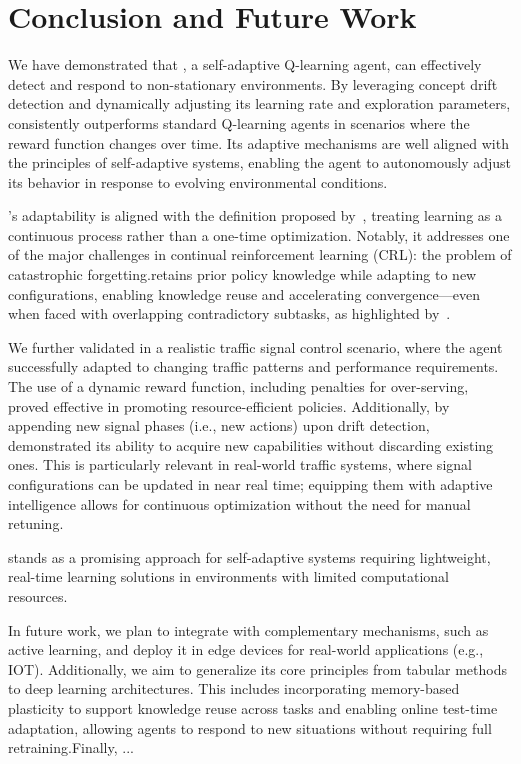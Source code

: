 
\section{Conclusion and Future Work}
\label{sec:conclusion}
We have demonstrated that \adaptiverl, a self-adaptive Q-learning agent, can effectively detect and respond to non-stationary environments. By leveraging concept drift detection and dynamically adjusting its learning rate and exploration parameters, \adaptiverl consistently outperforms standard Q-learning agents in scenarios where the reward function changes over time. Its adaptive mechanisms are well aligned with the principles of self-adaptive systems, enabling the agent to autonomously adjust its behavior in response to evolving environmental conditions.

\adaptiverl's adaptability is aligned with the definition proposed by~\citet{abel2023definitioncontinualreinforcementlearning}, treating learning as a continuous process rather than a one-time optimization. Notably, it addresses one of the major challenges in continual reinforcement learning (CRL): the problem of catastrophic forgetting.\adaptiverl retains prior policy knowledge while adapting to new configurations, enabling knowledge reuse and accelerating convergence—even when faced with overlapping contradictory subtasks, as highlighted by~\citet{Bagus2022}.

We further validated \adaptiverl in a realistic traffic signal control scenario, where the agent successfully adapted to changing traffic patterns and performance requirements. The use of a dynamic reward function, including penalties for over-serving, proved effective in promoting resource-efficient policies. Additionally, by appending new signal phases (i.e., new actions) upon drift detection, \adaptiverl demonstrated its ability to acquire new capabilities without discarding existing ones. This is particularly relevant in real-world traffic systems, where signal configurations can be updated in near real time; equipping them with adaptive intelligence allows for continuous optimization without the need for manual retuning.

\adaptiverl stands as a promising approach for self-adaptive systems requiring lightweight, real-time learning solutions in environments with limited computational resources.

In future work, we plan to integrate \adaptiverl with complementary mechanisms, such as active learning, and deploy it in edge devices for real-world applications (e.g., \ac{IOT}). Additionally, we aim to generalize its core principles from tabular methods to deep learning architectures. This includes incorporating memory-based plasticity to support knowledge reuse across tasks and enabling online test-time adaptation, allowing agents to respond to new situations without requiring full retraining.Finally, ...

\endinput

